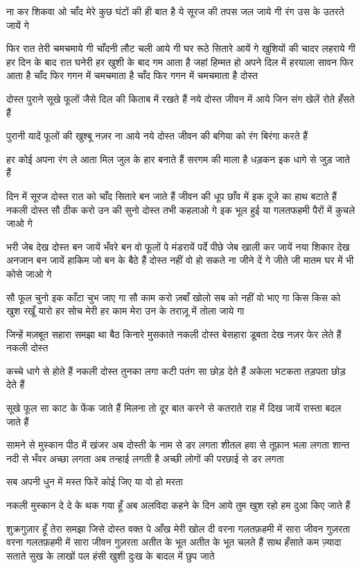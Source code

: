 ना कर शिकवा ओ चाँद मेरे
कुछ घंटों की ही बात है ये
सूरज की तपस जल जाये गी
रंग उस के उतरते जायें गे

फिर रात तेरी चमचमाये गी
चाँदनी लौट चली आये गी
घर रूठे सितारे आयें गे
खुशियों की चादर लहराये गी
हर दिन के बाद रात घनेरी
हर खुशी के बाद गम आता है
जहां हिम्मत हो अपने दिल में
हरयाला सावन फिर आता है
चाँद फिर गगन में चमचमाता है
चाँद फिर गगन में चमचमाता है
दोस्त

दोस्त पुराने सूखे फूलों जैसे
दिल की किताब में रखते हैं
नये दोस्त जीवन में आये
जिन संग खेलें रोते हँसते हैं

पुरानी यादें फूलों की खुश्बू
नज़र ना आये
नये दोस्त जीवन की बगिया को
रंग बिरंगा करते हैं

हर कोई अपना रंग ले आता
मिल जुल के हार बनाते हैं
सरगम की माला है धड़कन
इक धागे से जुड़ जाते हैं

दिन में सूरज दोस्त रात को
चाँद सितारे बन जाते हैं
जीवन की धूप छाँव में
इक दूजे का हाथ बटाते हैं
नकली दोस्त
सौ ठीक करो उन की सुनो
दोस्त तभी कहलाओ गे
इक भूल हुई या गलतफहमी
पैरों में कुचले जाओ गे

भरी जेब देख दोस्त बन जायें
भँवरे बन वो फूलों पे मंडरायें
पर्दे पीछे जेब खाली कर जायें
नया शिकार देख अनजान बन जायें
हाकिम जो बन के बैठे हैं
दोस्त नहीं वो हो सकते
ना जीने दें गे जीते जी
मातम घर में भी कोसे जाओ गे

सौ फूल चुनो इक काँटा चुभ जाए गा
सौ काम करो ज़बाँ खोलो
सब को नहीं वो भाए गा
किस किस को खुश रखूँ यारो
हर सोच मेरी हर काम मेरा
उन के तराज़ू में तोला जाये गा

जिन्हें मज़बूत सहारा समझा था
बैठ किनारे मुसकाते नकली दोस्त
बेसहारा डूबता देख
नज़र फेर लेते हैं नकली दोस्त

कच्चे धागे से होते हैं नकली दोस्त
तुनका लगा कटी पतंग सा छोड़ देते हैं 
अकेला भटकता तड़पता छोड़ देते हैं

सूखे फूल सा काट के फेंक जाते हैं 
मिलना तो दूर बात करने से कतराते
राह में दिख जायें रास्ता बदल जाते हैं

सामने से मुस्कान पीठ में खंजर
अब दोस्ती के नाम से डर लगता
शीतल हवा से तूफ़ान भला लगता
शान्त नदी से भँवर अच्छा लगता
अब तन्हाई लगती है अच्छी
लोगों की परछाई से डर लगता

सब अपनी धुन में मस्त फिरें
कोई जिए या वो हो मरता

नकली मुस्कान दे दे के थक गया हूँ
अब अलविदा कहने के दिन आये
तुम खुश रहो हम दुआ किए जाते हैं

शुक्रगुज़ार हूँ तेरा समझा जिसे दोस्त
वक्त पे आँख मेरी खोल दी
वरना गलतफ़हमी में सारा जीवन गुज़रता
वरना गलतफ़हमी में सारा जीवन गुज़रता
अतीत के भूत
अतीत के भूत चलते हैं साथ
हँसाते कम ज़्यादा सताते
सुख के लाखों पल हंसी खुशी
दुःख के बादल में छुप जाते

